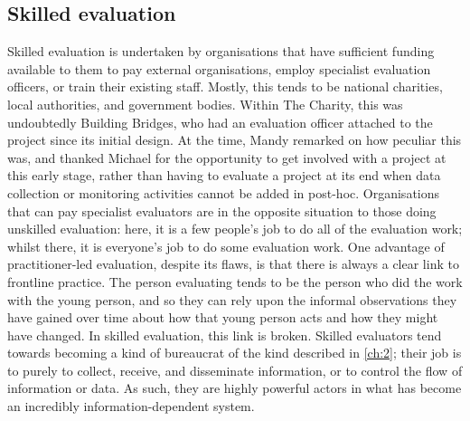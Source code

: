 \subsection{Skilled evaluation}
\label{subsec:6-4-2-skilled-eval}
Skilled evaluation is undertaken by organisations that have sufficient funding available to them to pay external organisations, employ specialist evaluation officers, or train their existing staff. Mostly, this tends to be national charities, local authorities, and government bodies. Within The Charity, this was undoubtedly Building Bridges, who had an evaluation officer attached to the project since its initial design. At the time, Mandy remarked on how peculiar this was, and thanked Michael for the opportunity to get involved with a project at this early stage, rather than having to evaluate a project at its end when data collection or monitoring activities cannot be added in post-hoc. Organisations that can pay specialist evaluators are in the opposite situation to those doing unskilled evaluation: here, it is a few people's job to do all of the evaluation work; whilst there, it is everyone's job to do some evaluation work. One advantage of practitioner-led evaluation, despite its flaws, is that there is always a clear link to frontline practice. The person evaluating tends to be the person who did the work with the young person, and so they can rely upon the informal observations they have gained over time about how that young person acts and how they might have changed. In skilled evaluation, this link is broken. Skilled evaluators tend towards becoming a kind of bureaucrat of the kind described in \ref{ch:2}; their job is to purely to collect, receive, and disseminate information, or to control the flow of information or data. As such, they are highly powerful actors in what has become an incredibly information-dependent system.

